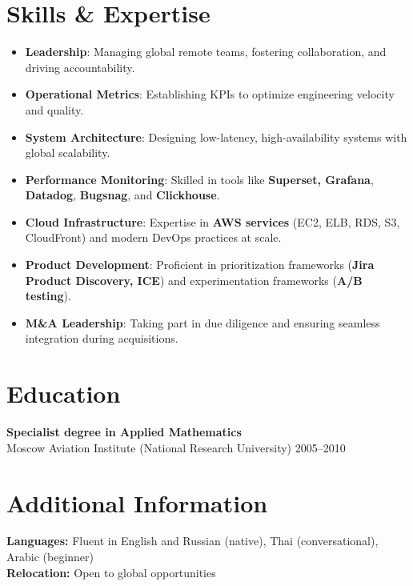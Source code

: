 \documentclass[11pt,a4paper]{article}
\begin{document}
\section*{Skills \& Expertise}
\begin{itemize}
    \item \textbf{Leadership}: Managing global remote teams, fostering collaboration, and driving accountability.
    \item \textbf{Operational Metrics}: Establishing KPIs to optimize engineering velocity and quality.
    \item \textbf{System Architecture}: Designing low-latency, high-availability systems with global scalability.
    \item \textbf{Performance Monitoring}: Skilled in tools like \textbf{Superset, Grafana}, \textbf{Datadog}, \textbf{Bugsnag}, and \textbf{Clickhouse}.
    \item \textbf{Cloud Infrastructure}: Expertise in \textbf{AWS services} (EC2, ELB, RDS, S3, CloudFront) and modern DevOps practices at scale.
    \item \textbf{Product Development}: Proficient in prioritization frameworks (\textbf{Jira Product Discovery, ICE}) and experimentation frameworks (\textbf{A/B testing}).
    \item \textbf{M\&A Leadership}: Taking part in due diligence and ensuring seamless integration during acquisitions.
\end{itemize}

\section*{Education}
\textbf{Specialist degree in Applied Mathematics} \\
Moscow Aviation Institute (National Research University) \hfill 2005--2010



\section*{Additional Information}
\textbf{Languages:} Fluent in English and Russian (native), Thai (conversational), Arabic (beginner) \\
\textbf{Relocation:} Open to global opportunities
\end{document}
